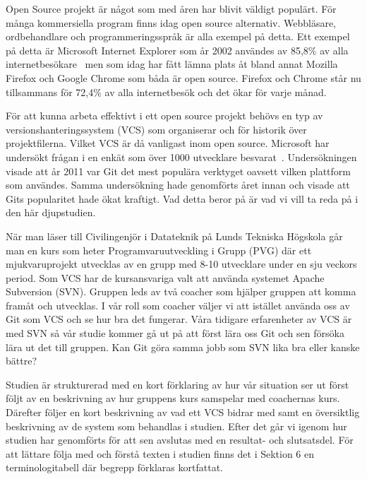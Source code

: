 Open Source projekt är något som med åren har blivit väldigt populärt. För många kommersiella program finns idag open source alternativ. Webbläsare, ordbehandlare och programmeringsspråk är alla exempel på detta. Ett exempel på detta är Microsoft Internet Explorer som år 2002 användes av 85,8\% av alla internetbesökare~\cite{Browser} men som idag har fått lämna plats åt bland annat Mozilla Firefox och Google Chrome som båda är open source. Firefox och Chrome står nu tillsammans för 72,4\% av alla internetbesök och det ökar för varje månad.

För att kunna arbeta effektivt i ett open source projekt behövs en typ av versionshanteringssystem (VCS) som organiserar och för historik över projektfilerna. Vilket VCS är då vanligast inom open source. Microsoft har undersökt frågan i en enkät som över 1000 utvecklare besvarat~\cite{OpenSource}. Undersökningen visade att år 2011 var Git det mest populära verktyget oavsett vilken plattform som användes. Samma undersökning hade genomförts året innan och visade att Gits popularitet hade ökat kraftigt. Vad detta beror på är vad vi vill ta reda på i den här djupstudien.

När man läser till Civilingenjör i Datateknik på Lunds Tekniska Högskola går man en kurs som heter Programvaruutveckling i Grupp (PVG) där ett mjukvaruprojekt utvecklas av en grupp med 8-10 utvecklare under en sju veckors period. Som VCS har de kursansvariga valt att använda systemet Apache Subversion (SVN). Gruppen leds av två coacher som hjälper gruppen att komma framåt och utvecklas. I vår roll som coacher väljer vi att istället använda oss av Git som VCS och se hur bra det fungerar. Våra tidigare erfarenheter av VCS är med SVN så vår studie kommer gå ut på att först lära oss Git och sen försöka lära ut det till gruppen. Kan Git göra samma jobb som SVN lika bra eller kanske bättre? 

Studien är strukturerad med en kort förklaring av hur vår situation ser ut först följt av en beskrivning av hur gruppens kurs samspelar med coachernas kurs. Därefter följer en kort beskrivning av vad ett VCS bidrar med samt en översiktlig beskrivning av de system som behandlas i studien. Efter det går vi igenom hur studien har genomförts för att sen avslutas med en resultat- och slutsatsdel. För att lättare följa med och förstå texten i studien finns det i Sektion 6 en terminologitabell där begrepp förklaras kortfattat.